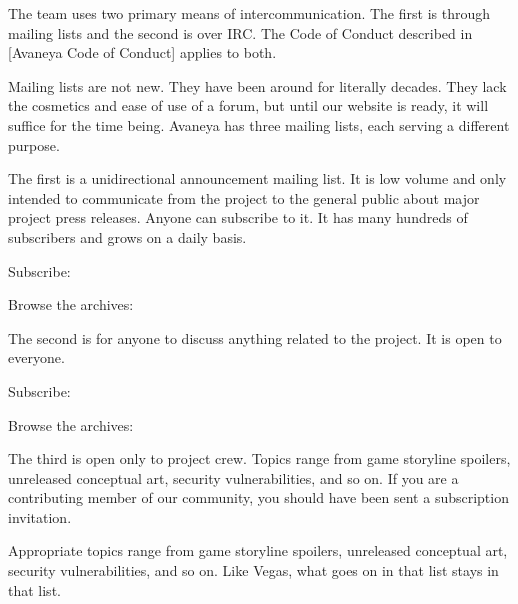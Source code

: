 
The team uses two primary means of intercommunication. The first is through mailing lists and the second is over IRC. The Code of Conduct described in [Avaneya Code of Conduct] applies to both.

Mailing lists are not new. They have been around for literally decades. They lack the cosmetics and ease of use of a forum, but until our website is ready, it will suffice for the time being. Avaneya has three mailing lists, each serving a different purpose.

The first is a unidirectional announcement mailing list. It is low volume and only intended to communicate from the project to the general public about major project press releases. Anyone can subscribe to it. It has many hundreds of subscribers and grows on a daily basis.

\blank[2*big]
\startnarrower[3*left]
Subscribe:\crlf
{} 

\blank[2*big]
Browse the archives:\crlf
{}
\stopnarrower

The second  is for anyone to discuss anything related to the project. It is open to everyone.

\blank[2*big]
\startnarrower[3*left]
Subscribe:\crlf
{} 

\blank[2*big]
Browse the archives:\crlf
{}
\stopnarrower

The third  is open only to project crew. Topics range from game storyline spoilers, unreleased conceptual art, security vulnerabilities, and so on. If you are a contributing member of our community, you should have been sent a subscription invitation. 

Appropriate topics range from game storyline spoilers, unreleased conceptual art, security vulnerabilities, and so on. Like Vegas, what goes on in that list stays in that list.

